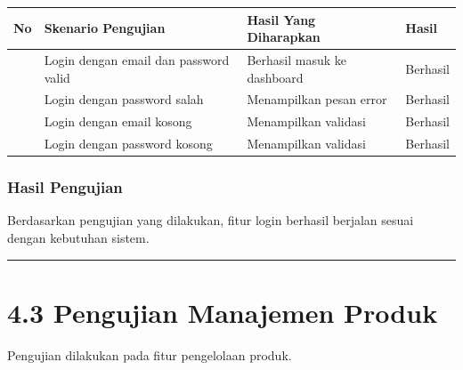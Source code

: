 {\def\LTcaptype{none} %
\begin{longtable}[]{@{}
  >{\raggedright\arraybackslash}p{}
  >{\raggedright\arraybackslash}p{}
  >{\raggedright\arraybackslash}p{}
  >{\raggedright\arraybackslash}p{}@{}}
\toprule\noalign{}
\begin{minipage}[b]{\linewidth}\raggedright
No
\end{minipage} & \begin{minipage}[b]{\linewidth}\raggedright
Skenario Pengujian
\end{minipage} & \begin{minipage}[b]{\linewidth}\raggedright
Hasil Yang Diharapkan
\end{minipage} & \begin{minipage}[b]{\linewidth}\raggedright
Hasil
\end{minipage} \\
\midrule\noalign{}
\endhead
\bottomrule\noalign{}
\endlastfoot
1 & Login dengan email dan password valid & Berhasil masuk ke dashboard & Berhasil \\
2 & Login dengan password salah & Menampilkan pesan error & Berhasil \\
3 & Login dengan email kosong & Menampilkan validasi & Berhasil \\
4 & Login dengan password kosong & Menampilkan validasi & Berhasil \\
\end{longtable}
}

\subsubsection{Hasil Pengujian}\label{hasil-pengujian}

Berdasarkan pengujian yang dilakukan, fitur login berhasil berjalan sesuai dengan kebutuhan sistem.

\begin{center}\rule{0.5\linewidth}{0.5pt}\end{center}

\section{4.3 Pengujian Manajemen Produk}\label{pengujian-manajemen-produk}

Pengujian dilakukan pada fitur pengelolaan produk.

